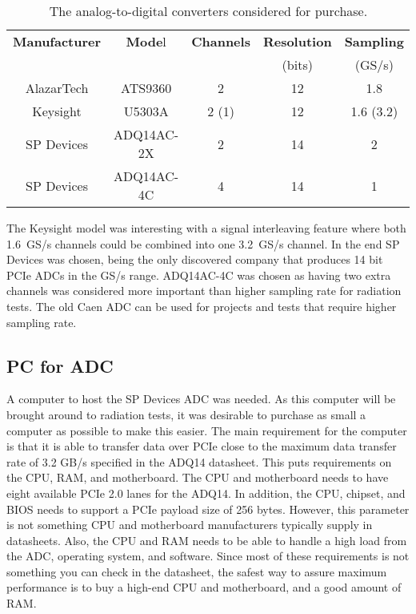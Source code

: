 \documentclass[../main/thesis.tex]{subfiles}
\begin{document}
\begin{table}[h]
\begin{center}
	\caption{The analog-to-digital converters considered for purchase.}
	\label{tab-adc}
	\begin{tabular}{ccccc}%
		\toprule %
		\textbf{Manufacturer} & \textbf{Mode}l & \textbf{Channels} & \textbf{Resolution} & \textbf{Sampling} \\ 
		 & & & (bits) & (GS/s) \\ \midrule%
		AlazarTech & ATS9360 & 2 & 12 & 1.8 \\ %
		Keysight & U5303A & 2 (1) & 12 & 1.6 (3.2) \\ %
		SP Devices & ADQ14AC-2X & 2 & 14 & 2 \\ %
		SP Devices & ADQ14AC-4C & 4 & 14 & 1 \\ \bottomrule%
	\end{tabular}
\end{center}
\end{table}

The Keysight model was interesting with a signal interleaving feature where both 1.6~GS/s channels could be combined into one 3.2~GS/s channel. In the end SP Devices was chosen, being the only discovered company that produces 14 bit \gls{PCIe} \gls{ADC}s in the GS/s range. ADQ14AC-4C was chosen as having two extra channels was considered more important than higher sampling rate for radiation tests. The old Caen \gls{ADC} can be used for projects and tests that require higher sampling rate. 

\subsection{PC for ADC}
\label{e-adc-pc}
A computer to host the SP Devices \gls{ADC} was needed. As this computer will be brought around to radiation tests, it was desirable to purchase as small a computer as possible to make this easier. The main requirement for the computer is that it is able to transfer data over \gls{PCIe} close to the maximum data transfer rate of 3.2 GB/s specified in the ADQ14 datasheet. This puts requirements on the CPU, RAM, and motherboard. The CPU and motherboard needs to have eight available \gls{PCIe} 2.0 lanes for the ADQ14. In addition, the CPU, chipset, and BIOS needs to support a \gls{PCIe} payload size of 256 bytes. However, this parameter is not something CPU and motherboard manufacturers typically supply in datasheets. Also, the CPU and RAM needs to be able to handle a high load from the ADC, operating system, and software. Since most of these requirements is not something you can check in the datasheet, the safest way to assure maximum performance is to buy a high-end CPU and motherboard, and a good amount of RAM.
\end{document}
